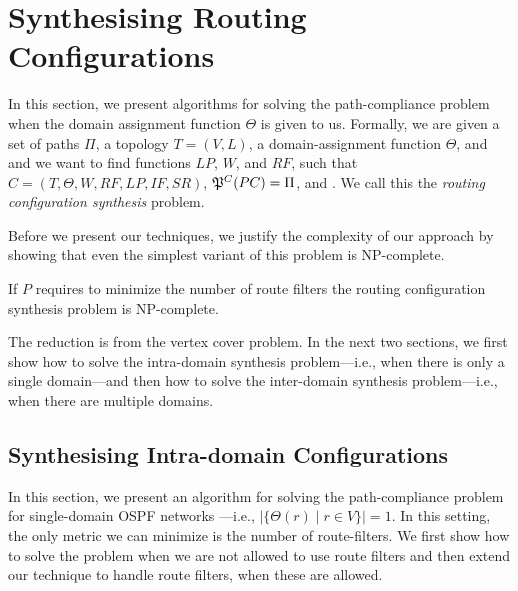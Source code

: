 \section{Synthesising Routing Configurations}
\label{sec:config-synthesis}

In this section, we present algorithms for 
solving the path-compliance problem when the domain
assignment function $\Theta$ is given to us.
Formally, we are given a set of paths $\Pi$,
a topology $T=(V,L)$,
a domain-assignment function $\Theta$, 
and 
and we want to find functions
$LP$, $W$, and $RF$,  such that
$C=(T,\Theta,W,RF,LP,IF,SR)$,
$\mathfrak{P}^C(PC) = \Pi$, and
.
We call this the \emph{routing configuration synthesis} problem.


Before we present our techniques,
we justify the complexity of our approach by showing that
even the simplest variant of this problem is NP-complete.
\begin{theorem}
\label{thm:ospfsynth}
If $P$ requires to minimize the number of route filters the routing configuration synthesis
problem is NP-complete.
\end{theorem}
\iffull

\else
The reduction is from the vertex cover problem.
\fi
In the next two sections, we first show how to solve the intra-domain synthesis problem---i.e., when there
is only a single domain---and then how to solve the inter-domain synthesis problem---i.e., when
there are multiple domains.

\subsection{Synthesising Intra-domain Configurations} \label{sec:intra-synthesis}
In this section, we present an algorithm for 
solving the path-compliance problem for 
single-domain OSPF networks
---i.e., $|\{\Theta(r) \mid r\in V\}|=1$.
In this setting, the only metric we can minimize is the number of route-filters.
We first show how to solve the problem when
we are not allowed to use route filters
and then
extend our technique to handle route filters, when these are allowed.

